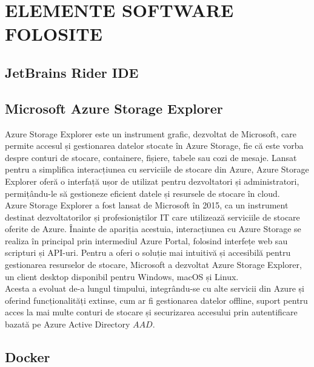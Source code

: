 \chapter {ELEMENTE SOFTWARE FOLOSITE}
\section{JetBrains Rider IDE}
\section{Microsoft Azure Storage Explorer}
{\hspace*{1cm} Azure Storage Explorer este un instrument grafic, dezvoltat de Microsoft, care permite
accesul și gestionarea datelor stocate în Azure Storage, fie că este vorba despre conturi de stocare,
containere, fișiere, tabele sau cozi de mesaje. Lansat pentru a simplifica interacțiunea cu serviciile
de stocare din Azure, Azure Storage Explorer oferă o interfață ușor de utilizat pentru dezvoltatori
și administratori, permițându-le să gestioneze eficient datele și resursele de stocare în cloud.}\parencite{azureStorageExplorer}\\
{\hspace*{1cm} Azure Storage Explorer a fost lansat de Microsoft în 2015, ca un instrument destinat
dezvoltatorilor și profesioniștilor IT care utilizează serviciile de stocare oferite de Azure. Înainte
de apariția acestuia, interacțiunea cu Azure Storage se realiza în principal prin intermediul Azure
Portal, folosind interfețe web sau scripturi și API-uri. Pentru a oferi o soluție mai intuitivă și
accesibilă pentru gestionarea resurselor de stocare, Microsoft a dezvoltat Azure Storage Explorer,
un client desktop disponibil pentru Windows, macOS și Linux.}\parencite{azureStorageExplorer}\\
{\hspace*{1cm} Acesta a evoluat de-a lungul timpului, integrându-se cu alte servicii din Azure și oferind
funcționalități extinse, cum ar fi gestionarea datelor offline, suport pentru acces la mai multe
conturi de stocare și securizarea accesului prin autentificare bazată pe Azure Active Directory
\(AAD\).}\parencite{azureStorageExplorer}
\section{Docker}